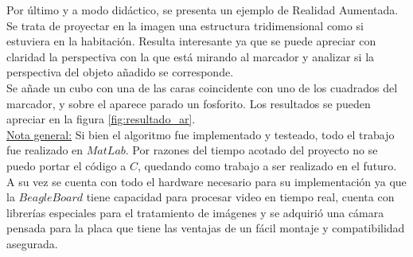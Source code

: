Por último y a modo didáctico, se presenta un ejemplo de Realidad Aumentada. Se trata de proyectar en la imagen una estructura tridimensional como si estuviera en la habitación. Resulta interesante ya que se puede apreciar con claridad la perspectiva con la que está mirando al marcador y analizar si la perspectiva del objeto añadido se corresponde.\\

Se añade un cubo con una de las caras coincidente con uno de los cuadrados del marcador, y sobre el aparece parado un fosforito. Los resultados se pueden apreciar en la figura \ref{fig:resultado_ar}.\\[25pt]

\underline{Nota general:} Si bien el algoritmo fue implementado y testeado, todo el trabajo fue realizado en $MatLab$. Por razones del tiempo acotado del proyecto no se puedo portar el código a $C$, quedando como trabajo a ser realizado en el futuro. A su vez se cuenta con todo el hardware necesario para su implementación ya que la $BeagleBoard$ tiene capacidad para procesar video en tiempo real, cuenta con librerías especiales para el tratamiento de imágenes y se adquirió una cámara pensada para la placa que tiene las ventajas de un fácil montaje y compatibilidad asegurada.

%